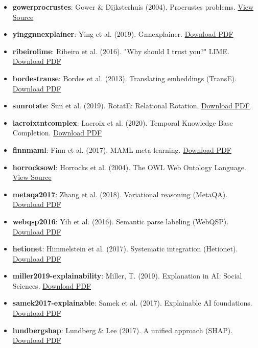\begin{itemize}
\item \textbf{gower\-procr\-ustes}: Gower \& Dijkst\-erhuis (2004). Procrustes problems. \href{https://openlibrary.org/books/OL8850117M/Procrustes_problems}{View Source}
\item \textbf{ying\-gnnex\-plainer}: Ying et al. (2019). Gnnexp\-lainer. \href{https://arxiv.org/pdf/1903.03894.pdf}{Download PDF}
\item \textbf{ribeiro\-lime}: Ribeiro et al. (2016). "Why should I trust you?" LIME. \href{https://arxiv.org/pdf/1602.04938.pdf}{Download PDF}
\item \textbf{bordes\-transe}: Bordes et al. (2013). Translating embeddings (TransE). \href{https://papers.nips.cc/paper/5071-translating-embeddings-for-modeling-multi-relational-data.pdf}{Download PDF}
\item \textbf{sun\-rotate}: Sun et al. (2019). RotatE: Relational Rotation. \href{https://arxiv.org/pdf/1902.10197.pdf}{Download PDF}
\item \textbf{lacroix\-tntco\-mplex}: Lacroix et al. (2020). Temporal Knowledge Base Completion. \href{https://openreview.net/pdf?id=Hye_S0NKvB}{Download PDF}
\item \textbf{finn\-maml}: Finn et al. (2017). MAML meta-learning. \href{https://arxiv.org/pdf/1703.03400.pdf}{Download PDF}
\item \textbf{horrocks\-owl}: Horrocks et al. (2004). The OWL Web Ontology Language. \href{https://www.w3.org/TR/owl-features/}{View Source}
\item \textbf{metaqa2017}: Zhang et al. (2018). Variational reasoning (MetaQA). \href{https://arxiv.org/pdf/1709.04071.pdf}{Download PDF}
\item \textbf{webqsp2016}: Yih et al. (2016). Semantic parse labeling (WebQSP). \href{https://aclanthology.org/P16-2033.pdf}{Download PDF}
\item \textbf{hetionet\-}: Himmelstein et al. (2017). Systematic integration (Hetionet). \href{https://elifesciences.org/articles/26726.pdf}{Download PDF}
\item \textbf{miller2019-expla\-inability}: Miller, T. (2019). Explanation in AI: Social Sciences. \href{https://arxiv.org/pdf/1706.07269.pdf}{Download PDF}
\item \textbf{samek2017-explainable}: Samek et al. (2017). Explainable AI foundations. \href{https://arxiv.org/pdf/1708.08296.pdf}{Download PDF}
\item \textbf{lundberg\-shap}: Lundberg \& Lee (2017). A unified approach (SHAP). \href{https://papers.nips.cc/paper/7062-a-unified-approach-to-interpreting-model-predictions.pdf}{Download PDF}

\end{itemize}
